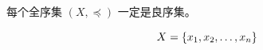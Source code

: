\begin{frame}{}
  \begin{theorem}
    每个全序集 $(X, \preceq)$ 一定是良序集。
  \end{theorem}

  \pause
  \[
    X = \{x_{1}, x_{2}, \dots, x_{n}\}
  \]
  \pause
  \begin{center}
     \pause \\[15pt]
     \pause \\[15pt]
  \end{center}
\end{frame}
